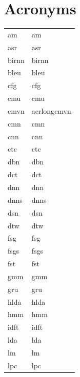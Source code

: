 \documentclass[12pt,twoside]{report}
\begin{document}
\listoffigures
 
\listoftables
{}
\listofalgorithms
\newpage
{}
\clearpage

\begin{table}[tp]
\chapter*{Acronyms}
  \label{tab:acronymns}
\begin{tabular}{ll}
\acrshort{am} & \acrlong{am}\\
\acrshort{asr} & \acrlong{asr}\\
\acrshort{birnn} & \acrlong{birnn}\\
\acrshort{bleu} & \acrlong{bleu}\\
\acrshort{cfg} & \acrlong{cfg} \\
\acrshort{cmu} & \acrlong{cmu} \\
\acrshort{cmvn} & acrlong{cmvn} \\
\acrshort{cmn} & \acrlong{cmn} \\
\acrshort{cnn} & \acrlong{cnn} \\
\acrshort{ctc} & \acrlong{ctc} \\
\acrshort{dbn} & \acrlong{dbn} \\
\acrshort{dct} & \acrlong{dct} \\
\acrshort{dnn} & \acrlong{dnn} \\
\acrshort{dnns} & \acrlong{dnns} \\
\acrshort{dsn} & \acrlong{dsn} \\
\acrshort{dtw} & \acrlong{dtw} \\
\acrshort{fsg} & \acrlong{fsg} \\
\acrshort{fsgs} & \acrlong{fsgs} \\
\acrshort{fst} & \acrlong{fst} \\
\acrshort{gmm} & \acrlong{gmm} \\
\acrshort{gru} & \acrlong{gru} \\
\acrshort{hlda} & \acrlong{hlda} \\
\acrshort{hmm} & \acrlong{hmm} \\
\acrshort{idft} & \acrlong{idft} \\
\acrshort{lda} & \acrlong{lda} \\
\acrshort{lm} & \acrlong{lm} \\
\acrshort{lpc} & \acrlong{lpc} \\

\end{tabular}
\end{table}
\end{document}
